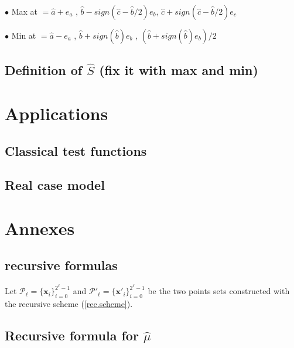 \documentclass[]{elsarticle}
\theoremstyle{definition}
\newcommand{\bvec}[1]{\boldsymbol{#1}}
\newcommand{\vx}{\bvec{x}}
\begin{document}
$\bullet$ Max at $= \hat{a} + e_a$  ,  $\hat{b} - sign(\hat{c}-\hat{b}/2) e_b$,  $\hat{c} + sign(\hat{c}-\hat{b}/2) e_c$

$\bullet$ Min at $= \hat{a} - e_a$  ,  $\hat{b} + sign(\hat{b}) e_b$  ,  $(\hat{b} + sign(\hat{b}) e_b)/2$
\subsection{Definition of $\widehat{S}$ (fix it with max and min)}


\section{Applications}
\label{appli}
\subsection{Classical test functions}
\subsection{Real case model}


\newpage
\section{Annexes}

\subsection{recursive formulas}
\label{recursive.formulas}

Let $\mathcal{P}_\ell=\{\vx_i\}_{i=0}^{2^\ell-1}$ and $\mathcal{P}'_\ell=\{{\vx'}_i\}_{i=0}^{2^\ell-1}$ be the two points sets constructed with the recursive scheme (\ref{rec.scheme}).  

\subsection{Recursive formula for $\hat{\mu}$}
\end{document}
